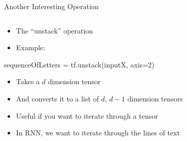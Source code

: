 \documentclass[aspectratio=169]{beamer}
\begin{document}
\begin{frame}[fragile]{Another Interesting Operation}

\begin{columns}[b]
\begin{column}{0.6\textwidth}
\begin{itemize}
\item The ``unstack'' operation
\item Example:
\end{itemize}
        \begin{SQL}
sequenceOfLetters = tf.unstack(inputX, axis=2)
        \end{SQL}
        \begin{itemize}
        \item Takes a $d$ dimension tensor 
	\item And converts it to a list of $d$, $d-1$ dimension tensors
	\item Useful if you want to iterate through a tensor
        \item In RNN, we want to iterate through the lines of text
        \end{itemize}
\end{column}
\begin{column}{0.4\textwidth}
\end{column}
\end{columns}

\end{frame}
%
%
\end{document}
